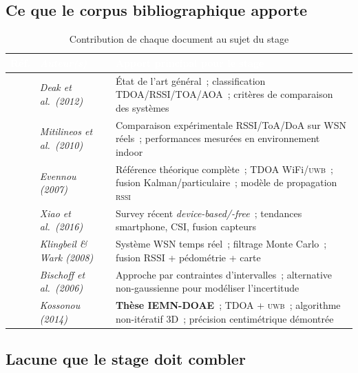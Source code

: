 \documentclass[12pt, a4paper]{article}
\newcommand{\RSSI}{\textsc{rssi}}
\newcommand{\UWB}{\textsc{uwb}}
\begin{document}
\subsection{Ce que le corpus bibliographique apporte}

\begin{table}[h!]
  \centering
  \caption{Contribution de chaque document au sujet du stage}
  \label{tab:corpus}
  \renewcommand{\arraystretch}{1.3}
  \begin{tabularx}{\textwidth}{
    >{\bfseries}p{1cm}
    >{\itshape}p{3.5cm}
    X
  }
    \toprule
    \rowcolor{iemnblue}
    \textcolor{white}{Réf.} &
    \textcolor{white}{Auteur(s)} &
    \textcolor{white}{Apport principal pour le stage} \\
    \midrule
    \cite{Deak2012}
      & Deak et al.\ (2012)
      & État de l'art général~; classification TDOA/RSSI/TOA/AOA~;
        critères de comparaison des systèmes \\
    \rowcolor{iemnlightblue!40}
    \cite{Mitilineos2010}
      & Mitilineos et al.\ (2010)
      & Comparaison expérimentale RSSI/ToA/DoA sur WSN réels~;
        performances mesurées en environnement indoor \\
    \cite{Evennou2007}
      & Evennou (2007)
      & Référence théorique complète~; TDOA WiFi/\UWB{}~;
        fusion Kalman/particulaire~; modèle de propagation \RSSI{} \\
    \rowcolor{iemnlightblue!40}
    \cite{Xiao2016}
      & Xiao et al.\ (2016)
      & Survey récent \textit{device-based/-free}~;
        tendances smartphone, CSI, fusion capteurs \\
    \cite{Klingbeil2008}
      & Klingbeil \& Wark (2008)
      & Système WSN temps réel~; filtrage Monte Carlo~;
        fusion RSSI + pédométrie + carte \\
    \rowcolor{iemnlightblue!40}
    \cite{Bischoff2006}
      & Bischoff et al.\ (2006)
      & Approche par contraintes d'intervalles~;
        alternative non-gaussienne pour modéliser l'incertitude \\
    \cite{Kossonou2014}
      & Kossonou (2014)
      & \textbf{Thèse IEMN-DOAE}~; TDOA + \UWB{}~;
        algorithme non-itératif 3D~; précision centimétrique démontrée \\
    \bottomrule
  \end{tabularx}
\end{table}

\subsection{Lacune que le stage doit combler}
\end{document}
